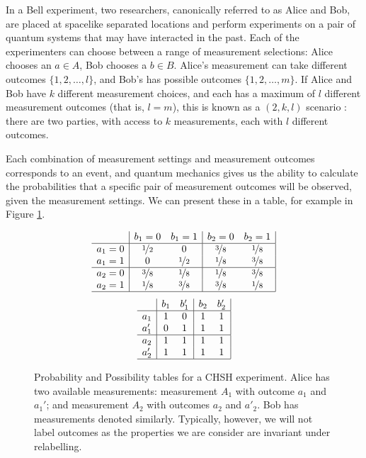 \documentclass[reprint]{revtex4-1}
\theoremstyle{definition}
\begin{document}
In a Bell experiment, two researchers, canonically referred to as Alice and Bob, are placed at spacelike separated locations and perform experiments on a pair of quantum systems that may have interacted in the past. Each of the experimenters can choose between a range of measurement selections: Alice chooses an $a\in A$, Bob chooses a $b\in B$. Alice's measurement can take different outcomes $\{1,2,\dots,l\}$, and Bob's has possible outcomes $\{1,2,\dots,m\}$. If Alice and Bob have $k$ different measurement choices, and each has a maximum of $l$ different measurement outcomes (that is, $l=m$), this is known as a $(2,k,l)$ scenario \cite{Mans2011}: there are two parties, with access to $k$ measurements, each with $l$ different outcomes.

Each combination of measurement settings and measurement outcomes corresponds to an event, and quantum mechanics gives us the ability to calculate the probabilities that a specific pair of measurement outcomes will be observed, given the measurement settings. We can present these in a table, for example in Figure \ref{CHSH}.%



\begin{figure}
\begin{equation*}
\begin{array}{c| c c | c c |}
&b_1=0&b_1=1&b_2=0&b_2=1\\ \hline
a_1=0&\nicefrac{1}{2} &0  & \nicefrac{3}{8} & \nicefrac{1}{8}\\
a_1=1&0&\nicefrac{1}{2}  &\nicefrac{1}{8} &\nicefrac{3}{8} \\ \hline
a_2=0&\nicefrac{3}{8}&\nicefrac{1}{8} &\nicefrac{1}{8} &\nicefrac{3}{8}  \\
a_2=1&\nicefrac{1}{8}&\nicefrac{3}{8} &\nicefrac{3}{8} & \nicefrac{1}{8} \\ \hline
\end{array} \end{equation*}\begin{equation*}
\begin{array}{c| c c | c c |}
&b_1&b_1'&b_2&b'_2\\ \hline
a_1&1 &0  &1 & 1\\
a_1'&0&1  &1 &1\\ \hline
a_2&1&1&1 &1 \\
a_2'&1&1 &1 &1 \\ \hline
\end{array} 
\end{equation*}
\caption{Probability and Possibility tables for a CHSH experiment. Alice has two available measurements: measurement $A_1$ with outcome $a_1$ and $a_1'$; and measurement $A_2$ with outcomes $a_2$ and $a'_2$. Bob has measurements denoted similarly. Typically, however, we will not label outcomes as the properties we are consider are invariant under relabelling.}
\label{CHSH}
\end{figure}
\end{document}
